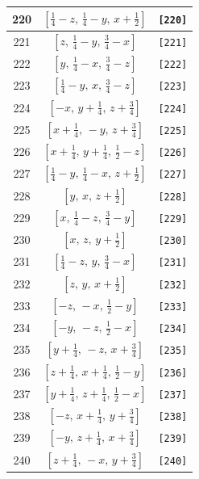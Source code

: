 \documentclass[fleqn,8pt]{jsarticle}
\begin{document}
\begin{longtable}{ccc}
220 & $\left[ \frac{1}{4} - z,\, \frac{1}{4} - y,\, x + \frac{1}{2} \right]$ & {\tt [220]} \\ \hline
221 & $\left[ z,\, \frac{1}{4} - y,\, \frac{3}{4} - x \right]$ & {\tt [221]} \\ \hline
222 & $\left[ y,\, \frac{1}{4} - x,\, \frac{3}{4} - z \right]$ & {\tt [222]} \\ \hline
223 & $\left[ \frac{1}{4} - y,\, x,\, \frac{3}{4} - z \right]$ & {\tt [223]} \\ \hline
224 & $\left[ - x,\, y + \frac{1}{4},\, z + \frac{3}{4} \right]$ & {\tt [224]} \\ \hline
225 & $\left[ x + \frac{1}{4},\, - y,\, z + \frac{3}{4} \right]$ & {\tt [225]} \\ \hline
226 & $\left[ x + \frac{1}{4},\, y + \frac{1}{4},\, \frac{1}{2} - z \right]$ & {\tt [226]} \\ \hline
227 & $\left[ \frac{1}{4} - y,\, \frac{1}{4} - x,\, z + \frac{1}{2} \right]$ & {\tt [227]} \\ \hline
228 & $\left[ y,\, x,\, z + \frac{1}{2} \right]$ & {\tt [228]} \\ \hline
229 & $\left[ x,\, \frac{1}{4} - z,\, \frac{3}{4} - y \right]$ & {\tt [229]} \\ \hline
230 & $\left[ x,\, z,\, y + \frac{1}{2} \right]$ & {\tt [230]} \\ \hline
231 & $\left[ \frac{1}{4} - z,\, y,\, \frac{3}{4} - x \right]$ & {\tt [231]} \\ \hline
232 & $\left[ z,\, y,\, x + \frac{1}{2} \right]$ & {\tt [232]} \\ \hline
233 & $\left[ - z,\, - x,\, \frac{1}{2} - y \right]$ & {\tt [233]} \\ \hline
234 & $\left[ - y,\, - z,\, \frac{1}{2} - x \right]$ & {\tt [234]} \\ \hline
235 & $\left[ y + \frac{1}{4},\, - z,\, x + \frac{3}{4} \right]$ & {\tt [235]} \\ \hline
236 & $\left[ z + \frac{1}{4},\, x + \frac{1}{4},\, \frac{1}{2} - y \right]$ & {\tt [236]} \\ \hline
237 & $\left[ y + \frac{1}{4},\, z + \frac{1}{4},\, \frac{1}{2} - x \right]$ & {\tt [237]} \\ \hline
238 & $\left[ - z,\, x + \frac{1}{4},\, y + \frac{3}{4} \right]$ & {\tt [238]} \\ \hline
239 & $\left[ - y,\, z + \frac{1}{4},\, x + \frac{3}{4} \right]$ & {\tt [239]} \\ \hline
240 & $\left[ z + \frac{1}{4},\, - x,\, y + \frac{3}{4} \right]$ & {\tt [240]} \\ \hline

\end{longtable}
\end{document}
